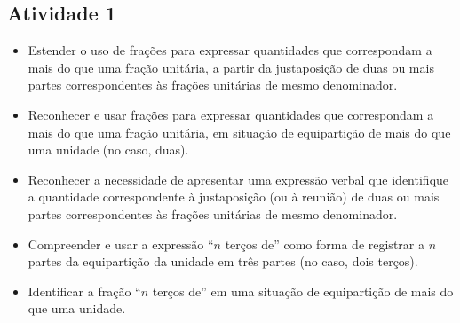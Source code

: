 \begin{multicols}{2}


\subsection{Atividade 1}

   \vspace{.1cm}

  \begin{itemize} %
    \item       Estender o uso de frações para expressar quantidades que correspondam a mais do que uma fração unitária, a partir da justaposição de duas ou mais partes correspondentes às frações unitárias de mesmo denominador.
    \item       Reconhecer e usar frações para expressar quantidades que correspondam a mais do que uma fração unitária, em situação de equipartição de mais do que uma unidade (no caso, duas).
    \item       Reconhecer a necessidade de apresentar uma expressão verbal que identifique a quantidade correspondente à justaposição (ou à reunião) de duas ou mais partes correspondentes às frações unitárias de mesmo denominador.
    \item       Compreender e usar a expressão       ``$n$ terços de''       como forma de registrar a       $n$       partes da equipartição da unidade em três partes (no caso, dois terços).
    \item       Identificar a fração       ``$n$ terços de''       em uma situação de equipartição de mais do que uma unidade.
\end{itemize} %


  \vspace{.1cm} 
  
  \vspace{.1cm}
  

\end{multicols}
